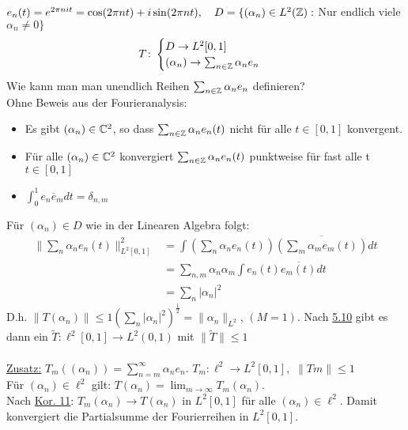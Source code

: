 \begin{beispiel}
	$e_{n} (t) = e^{2 \pi n i t} = \cos(2 \pi n t) + i \sin(2 \pi n t), \quad D = \{ (\alpha_{n}) \in L^{2}(\mathbb{Z}):$ Nur endlich viele $\alpha_{n} \neq 0 \}$
	\[ T \colon \begin{cases} D \rightarrow L^{2}[0, 1] \\ (\alpha_{n}) \rightarrow \sum_{n \in \mathbb{Z}} \alpha_{n} e_{n} \end{cases} \]
	Wie kann man man unendlich Reihen $\sum_{n \in \mathbb{Z}} \alpha_{n} e_{n}$ definieren? \\
	Ohne Beweis aus der Fourieranalysis:
	\begin{itemize}
		\item Es gibt $(\alpha_{n}) \in \mathbb{C}^{2}$, so dass $\sum_{n \in \mathbb{Z}} \alpha_{n} e_{n}(t)$ nicht für alle $t \in [0, 1]$ konvergent.
		\item Für alle $(\alpha_{n}) \in \mathbb{C}^{2}$ konvergiert $\sum_{n \in \mathbb{Z}} \alpha_{n} e_{n}(t)$ punktweise für fast alle t $t \in [0, 1]$
		\item $\int_{0}^{1} e_{n} \overline e_{m} dt = \delta_{n, m}$
	\end{itemize}
	Für $(\alpha_{n}) \in D$ wie in der Linearen Algebra folgt:
	\begin{align*}
		\| \sum_{n} \alpha_{n} e_{n}(t) \|_{L^{2}[0, 1]}^{2} & = \int (\sum_{n} \alpha_{n} e_{n}(t)) \overline{(\sum_{m} \alpha_{m} e_{m}(t))} dt \\
		& = \sum_{n, m} \alpha_{n} \alpha_{m} \int e_{n}(t) \overline{e_{m}(t)} dt \\
		& = \sum_{n} |\alpha_{n}|^2
	\end{align*}
	D.h. $\| T (\alpha_{n}) \| \leq 1 \left( \sum_{n} |\alpha_{n}|^2 \right)^{\frac{1}{2}} = \| \alpha_{n} \|_{L^{2}}$, $(M = 1)$. Nach \hyperref[prop:5.10]{5.10} gibt es dann ein $\tilde T: \ell^{2}[0, 1] \rightarrow L^{2}(0, 1)$ mit $\| \tilde T \| \leq 1$ \\ \\
	\uline{Zusatz:} $T_{m}((\alpha_{n})) = \sum_{n = m}^{\infty} \alpha_{n} e_{n}$. $T_{m}: \ell^{2} \rightarrow L^{2}[0, 1],$ $\| Tm \| \leq 1$ \\
	Für $(\alpha_{n}) \in \ell^{2}$ gilt: $T (\alpha_{n}) = \lim_{m \rightarrow \infty} T_{m}(\alpha_{n})$. \\
	Nach \hyperref[kor:5.11]{Kor. 11}: $T_{m}(\alpha_{n}) \rightarrow T (\alpha_{n})$ in $L^{2}[0, 1]$ für alle $(\alpha_{n}) \in \ell^{2}$. Damit konvergiert die Partialsumme der Fourierreihen in $L^{2}[0, 1]$.
\end{beispiel}


